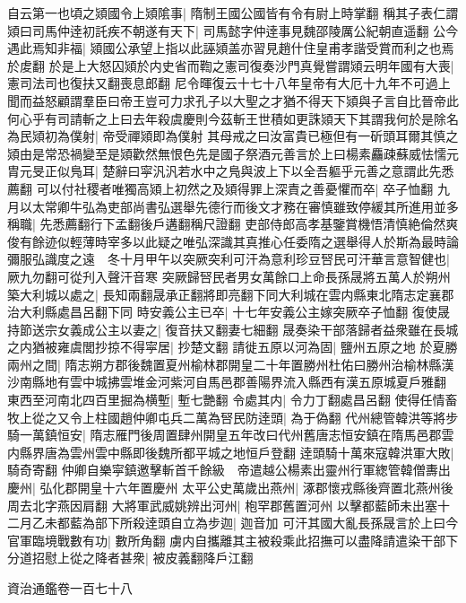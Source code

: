 自云第一也頃之熲國令上熲隂事|{
	隋制王國公國皆有令有尉上時掌翻}
稱其子表仁謂熲曰司馬仲逹初託疾不朝遂有天下|{
	司馬懿字仲逹事見魏邵陵厲公紀朝直遥翻}
公今遇此焉知非福|{
	熲國公承望上指以此誣熲盖亦習見趙什住皇甫孝諧受賞而利之也焉於䖍翻}
於是上大怒囚熲於内史省而鞫之憲司復奏沙門真覺嘗謂熲云明年國有大喪|{
	憲司法司也復扶又翻喪息郎翻}
尼令暉復云十七十八年皇帝有大厄十九年不可過上聞而益怒顧謂羣臣曰帝王豈可力求孔子以大聖之才猶不得天下熲與子言自比晉帝此何心乎有司請斬之上曰去年殺虞慶則今茲斬王世積如更誅熲天下其謂我何於是除名為民熲初為僕射|{
	帝受禪熲即為僕射}
其母戒之曰汝富貴已極但有一斫頭耳爾其慎之熲由是常恐禍變至是熲歡然無恨色先是國子祭酒元善言於上曰楊素麤疎蘇威怯懦元胄元旻正似鳬耳|{
	楚辭曰寜汎汎若水中之鳬與波上下以全吾軀乎元善之意謂此先悉薦翻}
可以付社稷者唯獨高熲上初然之及熲得罪上深責之善憂懼而卒|{
	卒子恤翻}
九月以太常卿牛弘為吏部尚書弘選舉先德行而後文才務在審慎雖致停緩其所進用並多稱職|{
	先悉薦翻行下孟翻後戶遘翻稱尺證翻}
吏部侍郎高孝基鑒賞機悟清慎絶倫然爽俊有餘迹似輕薄時宰多以此疑之唯弘深識其真推心任委隋之選舉得人於斯為最時論彌服弘識度之遠　冬十月甲午以突厥突利可汗為意利珍豆唘民可汗華言意智健也|{
	厥九勿翻可從刋入聲汗音寒}
突厥歸唘民者男女萬餘口上命長孫晟將五萬人於朔州築大利城以處之|{
	長知兩翻晟承正翻將即亮翻下同大利城在雲内縣東北隋志定襄郡治大利縣處昌呂翻下同}
時安義公主已卒|{
	十七年安義公主嫁突厥卒子恤翻}
復使晟持節送宗女義成公主以妻之|{
	復音扶又翻妻七細翻}
晟奏染干部落歸者益衆雖在長城之内猶被雍虞閭抄掠不得寜居|{
	抄楚文翻}
請徙五原以河為固|{
	鹽州五原之地}
於夏勝兩州之間|{
	隋志朔方郡後魏置夏州榆林郡開皇二十年置勝州杜佑曰勝州治榆林縣漢沙南縣地有雲中城拂雲堆金河紫河自馬邑郡善陽界流入縣西有漢五原城夏戶雅翻}
東西至河南北四百里掘為横塹|{
	塹七艷翻}
令處其内|{
	令力丁翻處昌呂翻}
使得任情畜牧上從之又令上柱國趙仲卿屯兵二萬為唘民防逹頭|{
	為于偽翻}
代州總管韓洪等將步騎一萬鎮恒安|{
	隋志雁門後周置肆州開皇五年改曰代州舊唐志恒安鎮在隋馬邑郡雲内縣界唐為雲州雲中縣即後魏所都平城之地恒戶登翻}
逹頭騎十萬來寇韓洪軍大敗|{
	騎奇寄翻}
仲卿自樂寜鎮邀擊斬首千餘級　帝遣越公楊素出靈州行軍緫管韓僧夀出慶州|{
	弘化郡開皇十六年置慶州}
太平公史萬歲出燕州|{
	涿郡懷戎縣後齊置北燕州後周去北字燕因肩翻}
大將軍武威姚辨出河州|{
	枹罕郡舊置河州}
以擊都藍師未出塞十二月乙未都藍為部下所殺逹頭自立為步迦|{
	迦音加}
可汗其國大亂長孫晟言於上曰今官軍臨境戰數有功|{
	數所角翻}
虜内自攜離其主被殺乘此招撫可以盡降請遣染干部下分道招慰上從之降者甚衆|{
	被皮義翻降戶江翻}


資治通鑑卷一百七十八
